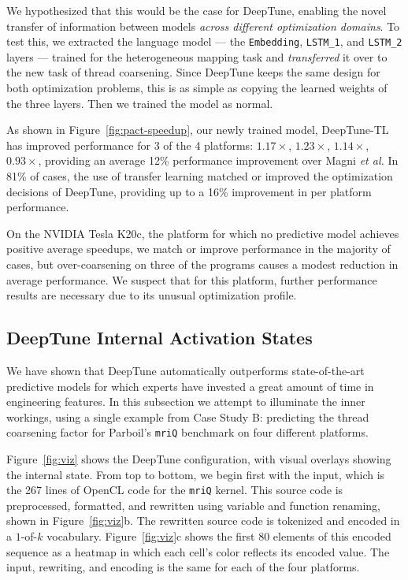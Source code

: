 We hypothesized that this would be the case for DeepTune, enabling the novel
transfer of information between models \emph{across different optimization
domains}. To test this, we extracted the language model --- the
\texttt{Embedding}, \texttt{LSTM\_1}, and \texttt{LSTM\_2} layers --- trained
for the heterogeneous mapping task and \emph{transferred} it over to the new
task of thread coarsening. Since DeepTune keeps the same design for both
optimization problems, this is as simple as copying the learned weights of the
three layers. Then we trained the model as normal.

As shown in Figure~\ref{fig:pact-speedup}, our newly trained model, DeepTune-TL
has improved performance for 3 of the 4 platforms: $1.17\times$, $1.23\times$,
$1.14\times$, $0.93\times$, providing an average 12\% performance improvement
over Magni \emph{et al.}  In 81\% of cases, the use of transfer learning matched
or improved the optimization decisions of DeepTune, providing up to a 16\%
improvement in per platform performance.

On the NVIDIA Tesla K20c, the platform for which no predictive model achieves
positive average speedups, we match or improve performance in the majority of
cases, but over-coarsening on three of the programs causes a modest reduction in
average performance. We suspect that for this platform, further performance
results are necessary due to its unusual optimization profile.


\subsection{DeepTune Internal Activation States}



We have shown that DeepTune automatically outperforms state-of-the-art
predictive models for which experts have invested a great amount of time in
engineering features. In this subsection we attempt to illuminate the inner
workings, using a single example from Case Study B: predicting the thread
coarsening factor for Parboil's \texttt{mriQ} benchmark on four different
platforms.

Figure~\ref{fig:viz} shows the DeepTune configuration, with visual overlays
showing the internal state. From top to bottom, we begin first with the input,
which is the 267 lines of OpenCL code for the \texttt{mriQ} kernel. This source
code is preprocessed, formatted, and rewritten using variable and function
renaming, shown in Figure~\ref{fig:viz}b. The rewritten source code is tokenized
and encoded in a $1$-of-$k$ vocabulary. Figure~\ref{fig:viz}c shows the first 80
elements of this encoded sequence as a heatmap in which each cell's color
reflects its encoded value. The input, rewriting, and encoding is the same for
each of the four platforms.

